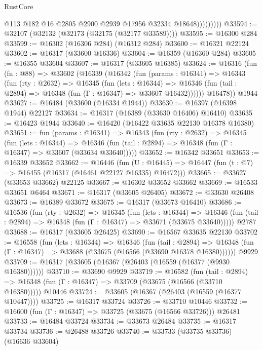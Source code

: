 \begin{lexlean}{RustCore}
\begin{coremodule}
                      @113
                      @182
                      @16
                      @2805
                      @2900
                      @2939
                      @17956
                      @32334
                      @18648)))))))))
@33594 := @32107 (@32132 (@32173 (@32175 (@32177 @33589))))
@33595 := @16300 @284
@33599 := @16302 (@16306 @284) (@16312 @284)
@33600 := @16321 @22124
@33602 := @16317 (@33600 @16336)
@33604 := @16359 (@16360 @284)
@33605 := @16355 @33604
@33607 := @16317 (@33605 @16385)
@33624 := @16316
    (fun (fn : @88) =>
    @33602
      (@16339
        (@16342
          (fun (params : @16341) =>
          @16343
            (fun (rty : @2632) =>
            @16345
              (fun (lets : @16344) =>
              @16346 (fun (tail : @2894) => @16348 (fun (Γ : @16347) => @33607 @16432))))))
        @16478))
    @1944
@33627 := @16484 (@33600 (@16334 @1944))
@33630 := @16397 (@16398 @1944) @22127
@33634 := @16317 (@16389 (@33630 @16406) @16410)
@33635 := @16423 @1944
@33640 := @16420 (@16422 @33635 @22130 @16378 @16380)
@33651 := fun (params : @16341) =>
  @16343
    (fun (rty : @2632) =>
    @16345
      (fun (lets : @16344) =>
      @16346 (fun (tail : @2894) => @16348 (fun (Γ : @16347) => @33607 (@33634 @33640)))))
@33652 := @16342 @33651
@33653 := @16339 @33652
@33662 := @16446
    (fun (U : @16445) => @16447 (fun (t : @7) => @16455 (@16317 (@16461 @22127 @16335) @16472)))
@33665 := @33627 (@33653 @33662) @22125
@33667 := @16302 @33652 @33662
@33669 := @16533 @33651 @6464
@33671 := @16317 (@33605 @26405)
@33672 := @33630 @26408
@33673 := @16389 @33672
@33675 := @16317 (@33673 @16410)
@33686 := @16536
    (fun (rty : @2632) =>
    @16345
      (fun (lets : @16344) =>
      @16346 (fun (tail : @2894) => @16348 (fun (Γ : @16347) => @33671 (@33675 @33640)))))
    @2787
@33688 := @16317 (@33605 @26425)
@33690 := @16567 @33635 @22130
@33702 := @16558
    (fun (lets : @16344) =>
    @16346
      (fun (tail : @2894) =>
      @16348 (fun (Γ : @16347) => @33688 (@33675 (@16566 (@33690 @16378 @16380))))))
    @9929
@33709 := @16317 (@33605 (@16367 (@26403 (@16559 (@16377 (@9930 @16380))))))
@33710 := @33690 @9929
@33719 := @16582
    (fun (tail : @2894) => @16348 (fun (Γ : @16347) => @33709 (@33675 (@16566 (@33710 @16380)))))
    @10446
@33724 := @33605 (@16367 (@26403 (@16559 (@16377 @10447))))
@33725 := @16317 @33724
@33726 := @33710 @10446
@33732 := @16600 (fun (Γ : @16347) => @33725 (@33675 (@16566 @33726))) @26481
@33733 := @16484 @33724
@33734 := @33673 @26484
@33735 := @16317 @33734
@33736 := @26488 @33726
@33740 := @33733 (@33735 @33736) (@16636 @33604)

\end{coremodule}
\end{lexlean}

